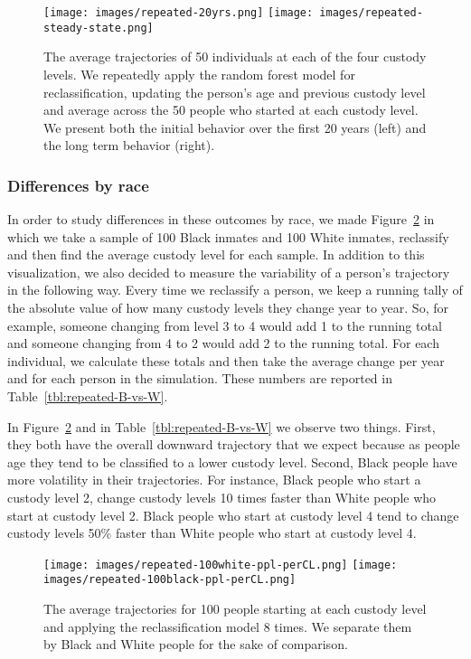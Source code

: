 \documentclass{amsproc}
\numberwithin{equation}{section}
\theoremstyle{plain}
\theoremstyle{remark}
\begin{document}
\begin{figure}
\centering
\texttt{[image: images/repeated-20yrs.png]}
\hfill
\texttt{[image: images/repeated-steady-state.png]}
\caption{The average trajectories of 50 individuals at each of the four custody levels.  We repeatedly apply the random forest model for reclassification, updating the person's age and previous custody level and average across the 50 people who started at each custody level.  We present both the initial behavior over the first 20 years (left) and the long term behavior (right).}\label{fig:repeated-avg}
\end{figure}



\subsubsection{Differences by race}

In order to study differences in these outcomes by race, we made Figure~\ref{fig:repeated-B-vs-W} in which we take a sample of 100 Black inmates and 100 White inmates, reclassify and then find the average custody level for each sample.  In addition to this visualization, we also decided to measure the variability of a person's trajectory in the following way.  Every time we reclassify a person, we keep a running tally of the absolute value of how many custody levels they change year to year.  So, for example, someone changing from level 3 to 4 would add 1 to the running total and someone changing from 4 to 2 would add 2 to the running total.  For each individual, we calculate these totals and then take the average change per year and for each person in the simulation.  These numbers are reported in Table~\ref{tbl:repeated-B-vs-W}.  

In Figure~\ref{fig:repeated-B-vs-W} and in Table~\ref{tbl:repeated-B-vs-W} we observe two things.  First, they both have the overall downward trajectory that we expect because as people age they tend to be classified to a lower custody level.  Second, Black people have more volatility in their trajectories.  For instance, Black people who start a custody level 2, change custody levels 10 times faster than White people who start at custody level 2.  Black people who start at custody level 4 tend to change custody levels 50\% faster than White people who start at custody level 4.  


\begin{figure}
\centering
\texttt{[image: images/repeated-100white-ppl-perCL.png]}
\hfill
\texttt{[image: images/repeated-100black-ppl-perCL.png]}
\caption{The average trajectories for 100 people starting at each custody level and applying the reclassification model 8 times.  We separate them by Black and White people for the sake of comparison.}\label{fig:repeated-B-vs-W}
\end{figure}
\end{document}
